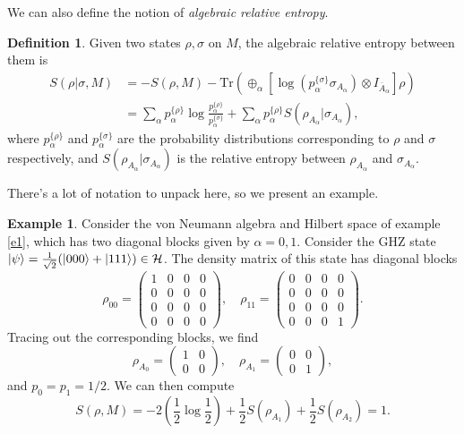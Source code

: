 \documentclass[12pt,a4paper]{report}
\numberwithin{equation}{section}
\newcommand{\ol}[1]{\overline{#1}}
\newcommand{\tr}{\text{Tr}}
\theoremstyle{definition}
\newtheorem{definition}{Definition}[section]
\theoremstyle{theorem}
\theoremstyle{theorem}
\theoremstyle{example}
\newtheorem{example}{Example}[section]
\theoremstyle{definition}
\begin{document}
We can also define the notion of \textit{algebraic relative entropy}.
\begin{definition}
	Given two states $\rho,\sigma$ on $M$, the algebraic relative entropy between them is
	\begin{equation}
		\begin{aligned}
			S(\rho|\sigma,M)&=-S(\rho,M)-\tr\left(\oplus_{\alpha}\left[\log\left(p_{\alpha}^{\{\sigma\}}\sigma_{A_{\alpha}}\right)\otimes I_{\ol{A}_{\alpha}}\right]\rho\right)\\&=\sum_{\alpha}p_{\alpha}^{\{\rho\}}\log\frac{p_{\alpha}^{\{\rho\}}}{p_{\alpha}^{\{\sigma\}}}+\sum_{\alpha}p_{\alpha}^{\{\rho\}}S(\rho_{A_{\alpha}}|\sigma_{A_{\alpha}}),
		\end{aligned}
	\end{equation}
	where $p_{\alpha}^{\{\rho\}}$ and $p_{\alpha}^{\{\sigma\}}$ are the probability distributions corresponding to $\rho$ and $\sigma$ respectively, and $S(\rho_{A_{\alpha}}|\sigma_{A_{\alpha}})$ is the relative entropy between $\rho_{A_{\alpha}}$ and $\sigma_{A_{\alpha}}$.
\end{definition}
There's a lot of notation to unpack here, so we present an example.
\begin{example}
	Consider the von Neumann algebra and Hilbert space of example \ref{e1}, which has two diagonal blocks given by $\alpha=0,1$. Consider the GHZ state $\ket{\psi}=\frac{1}{\sqrt{2}}(\ket{000}+\ket{111})\in\mathcal{H}$. The density matrix of this state has diagonal blocks
	\begin{equation}
		\rho_{00}=\begin{pmatrix}
			1&0&0&0\\
			0&0&0&0\\
			0&0&0&0\\
			0&0&0&0
		\end{pmatrix},\quad\rho_{11}=\begin{pmatrix}
		0&0&0&0\\
		0&0&0&0\\
		0&0&0&0\\
		0&0&0&1
	\end{pmatrix}.
	\end{equation}
	Tracing out the corresponding blocks, we find
	\begin{equation}
		\rho_{A_{0}}=\begin{pmatrix}1&0\\0&0\end{pmatrix},\quad\rho_{A_{1}}=\begin{pmatrix}0&0\\0&1\end{pmatrix},
	\end{equation}
	and $p_{0}=p_{1}=1/2$. We can then compute
	\begin{equation}
		S(\rho,M)=-2\left(\frac{1}{2}\log\frac{1}{2}\right)+\frac{1}{2}S(\rho_{A_{1}})+\frac{1}{2}S(\rho_{A_{2}})=1.
	\end{equation}
\end{example}
\end{document}
